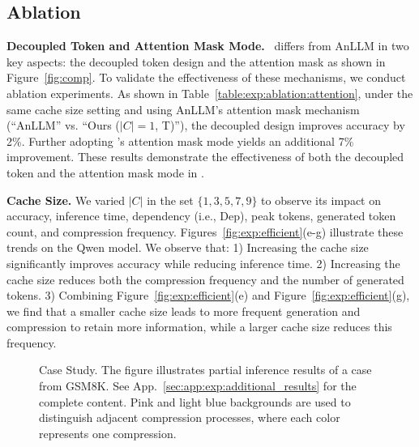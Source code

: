 
\vspace{-1mm}
\subsection{Ablation}
\label{ablation}
\textbf{Decoupled Token and Attention Mask Mode.}
\ours~differs from AnLLM in two key aspects: the decoupled token design and the attention mask as shown in Figure~\ref{fig:comp}. 
To validate the effectiveness of these mechanisms, we conduct ablation experiments.  
As shown in Table~\ref{table:exp:ablation:attention}, under the same cache size setting and using AnLLM's attention mask mechanism (``AnLLM'' vs. ``Ours ($|C|=1$, T)''), the decoupled design improves accuracy by 2\%. 
Further adopting \ours's attention mask mode yields an additional 7\% improvement. 
These results demonstrate the effectiveness of both the decoupled token and the attention mask mode in \ours.

\textbf{Cache Size.}
We varied $|C|$ in the set $\{1,3,5,7,9\}$ to observe its impact on accuracy, inference time, dependency (i.e., Dep), peak tokens, generated token count, and compression frequency. 
Figures~\ref{fig:exp:efficient}(e-g) illustrate these trends on the Qwen model. 
We observe that:  
1) Increasing the cache size significantly improves accuracy while reducing inference time.
2) Increasing the cache size reduces both the compression frequency and the number of generated tokens.
3) Combining Figure~\ref{fig:exp:efficient}(e) and Figure~\ref{fig:exp:efficient}(g), we find that a smaller cache size leads to more frequent generation and compression to retain more information, while a larger cache size reduces this frequency.  

\begin{figure}[!t] %
    \centering
    \caption{
    Case Study. 
    The figure illustrates partial inference results of a case from GSM8K.
    See App.~\ref{sec:app:exp:additional_results} for the complete content.  
    Pink and light blue backgrounds are used to distinguish adjacent compression processes, where each color represents one compression.}
    \label{fig:exp:case}
    \vspace{-3mm}
\end{figure} 
